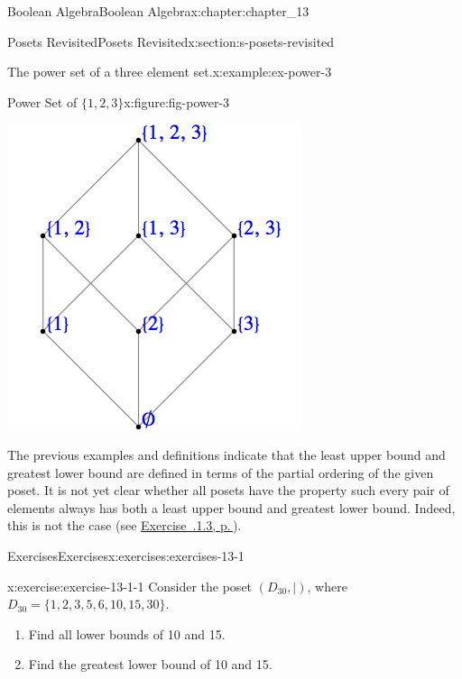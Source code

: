 \documentclass[twoside,10pt,]{book}
\newcommand{\xreffont}{\relax}
\numberwithin{equation}{section}
\begin{document}
\begin{chapterptx}{Boolean Algebra}{}{Boolean Algebra}{}{}{x:chapter:chapter_13}
\begin{sectionptx}{Posets Revisited}{}{Posets Revisited}{}{}{x:section:s-posets-revisited}
\begin{example}{The power set of a three element set.}{x:example:ex-power-3}
\begin{figureptx}{Power Set of \(\{1, 2, 3\}\)}{x:figure:fig-power-3}{}
\begin{image}{0.3}{0.4}{0.3}
\includegraphics[width=\linewidth]{images/fig-power-3.png}
\end{image}%
\tcblower
\end{figureptx}%
\end{example}
The previous examples and definitions indicate that the least upper bound and greatest lower bound  are defined in terms of the partial ordering of the given poset. It is not yet clear whether all posets have the property such every pair of elements always has both a least upper bound and greatest lower bound. Indeed, this is not the case (see \hyperlink{x:exercise:exercise-13-1-3}{Exercise~{\xreffont 13.1.1.3}, p.\,\pageref{x:exercise:exercise-13-1-3}}).%
%
%
\typeout{************************************************}
\typeout{************************************************}
%
\begin{exercises-subsection}{Exercises}{}{Exercises}{}{}{x:exercises:exercises-13-1}
\begin{divisionexercise}{1}{}{}{x:exercise:exercise-13-1-1}%
Consider the poset \((D_{30},\mid)\), where \(D_{30} = \{1,2, 3, 5, 6, 10, 15, 30\}\).%
\begin{enumerate}[label=(\alph*)]
\item{}Find all lower bounds of 10 and 15.%
\item{}Find the greatest lower bound  of 10 and 15.%

\end{enumerate}
\end{divisionexercise}
\end{exercises-subsection}
\end{sectionptx}
\end{chapterptx}
\end{document}
